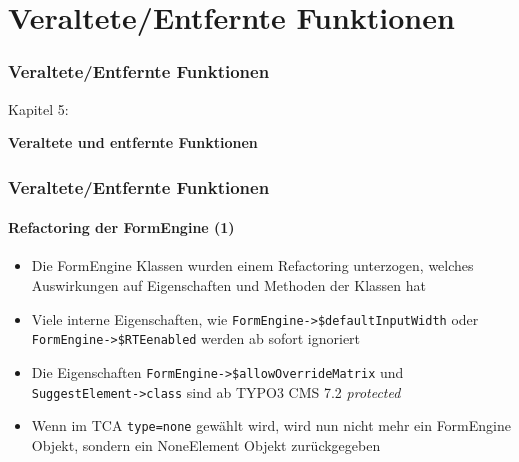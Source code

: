 %

\section{Veraltete/Entfernte Funktionen}
\begin{frame}[fragile]
	\frametitle{Veraltete/Entfernte Funktionen}

	\begin{center}\huge{Kapitel 5:}\end{center}
	\begin{center}\huge{\color{typo3darkgrey}\textbf{Veraltete und entfernte Funktionen}}\end{center}

\end{frame}


\begin{frame}[fragile]
	\frametitle{Veraltete/Entfernte Funktionen}
	\framesubtitle{Refactoring der FormEngine (1)}

	\begin{itemize}

		\item Die FormEngine Klassen wurden einem Refactoring unterzogen, welches Auswirkungen
			auf Eigenschaften und Methoden der Klassen hat

		\item Viele interne Eigenschaften, wie \small\texttt{FormEngine->\$defaultInputWidth}\normalsize\space
			oder \small\texttt{FormEngine->\$RTEenabled}\normalsize\space
			werden ab sofort ignoriert

		\item Die Eigenschaften \small\texttt{FormEngine->\$allowOverrideMatrix}\normalsize\space
			und \small\texttt{SuggestElement->class}\normalsize\space
			sind ab TYPO3 CMS 7.2 \textit{protected}

		\item Wenn im TCA \texttt{type=none} gewählt wird, wird nun nicht mehr ein FormEngine
			Objekt, sondern ein NoneElement Objekt zurückgegeben

	\end{itemize}

\end{frame}

